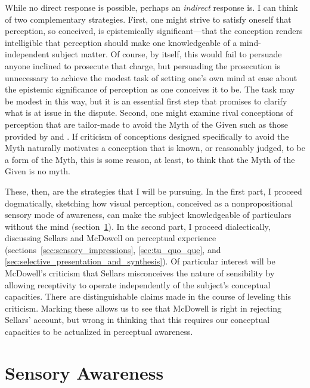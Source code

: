 \documentclass[12pt]{article}
\begin{document}
While no direct response is possible, perhaps an \emph{indirect} response is. I can think of two complementary strategies. First, one might strive to satisfy oneself that perception, so conceived, is epistemically significant---that the conception renders intelligible that perception should make one knowledgeable of a mind-independent subject matter. Of course, by itself, this would fail to persuade anyone inclined to prosecute that charge, but persuading the prosecution is unnecessary to achieve the modest task of setting one's own mind at ease about the epistemic significance of perception as one conceives it to be. The task may be modest in this way, but it is an essential first step that promises to clarify what is at issue in the dispute. Second, one might examine rival conceptions of perception that are tailor-made to avoid the Myth of the Given such as those provided by \citet{Sellars:1956xp,Sellars:1967uq} and \citet{McDowell:1996uq,McDowell:1998vn,McDowell:2008fk}. If criticism of conceptions designed specifically to avoid the Myth naturally motivates a conception that is known, or reasonably judged, to be a form of the Myth, this is some reason, at least, to think that the Myth of the Given is no myth. 

These, then, are the strategies that I will be pursuing. In the first part, I proceed dogmatically, sketching how visual perception, conceived as a nonpropositional sensory mode of awareness, can make the subject knowledgeable of particulars without the mind (section~\ref{sec:sensory_awareness}). In the second part, I proceed dialectically, discussing Sellars and McDowell on perceptual experience (sections~\ref{sec:sensory_impressions}, \ref{sec:tu_quo_que}, and \ref{sec:selective_presentation_and_synthesis}). Of particular interest will be McDowell's criticism that Sellars misconceives the nature of sensibility by allowing receptivity to operate independently of the subject's conceptual capacities. There are distinguishable claims made in the course of leveling this criticism. Marking these allows us to see that McDowell is right in rejecting Sellars' account, but wrong in thinking that this requires our conceptual capacities to be actualized in perceptual awareness.


\section{Sensory Awareness} %
\label{sec:sensory_awareness}
\end{document}
